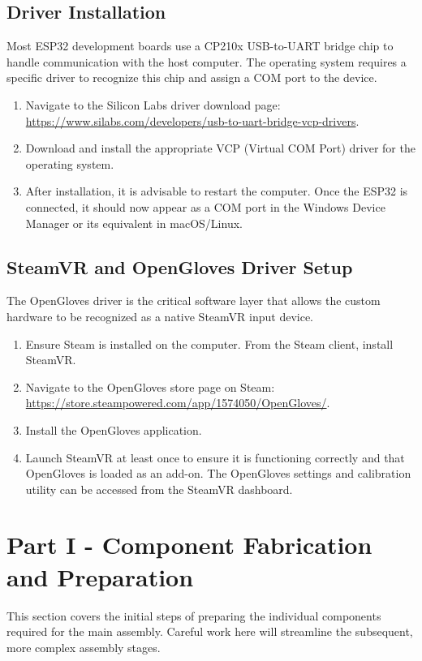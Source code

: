 \documentclass{article}
\begin{document}
\subsection{Driver Installation}
Most ESP32 development boards use a CP210x USB-to-UART bridge chip to handle communication with the host computer. The operating system requires a specific driver to recognize this chip and assign a COM port to the device.
\begin{enumerate}
    \item Navigate to the Silicon Labs driver download page: \url{https://www.silabs.com/developers/usb-to-uart-bridge-vcp-drivers}.
    \item Download and install the appropriate VCP (Virtual COM Port) driver for the operating system.
    \item After installation, it is advisable to restart the computer. Once the ESP32 is connected, it should now appear as a COM port in the Windows Device Manager or its equivalent in macOS/Linux.
\end{enumerate}

\subsection{SteamVR and OpenGloves Driver Setup}
The OpenGloves driver is the critical software layer that allows the custom hardware to be recognized as a native SteamVR input device.
\begin{enumerate}
    \item Ensure Steam is installed on the computer. From the Steam client, install SteamVR.
    \item Navigate to the OpenGloves store page on Steam: \url{https://store.steampowered.com/app/1574050/OpenGloves/}.
    \item Install the OpenGloves application.
    \item Launch SteamVR at least once to ensure it is functioning correctly and that OpenGloves is loaded as an add-on. The OpenGloves settings and calibration utility can be accessed from the SteamVR dashboard.
\end{enumerate}

\newpage
\section{Part I - Component Fabrication and Preparation}
This section covers the initial steps of preparing the individual components required for the main assembly. Careful work here will streamline the subsequent, more complex assembly stages.
\end{document}
